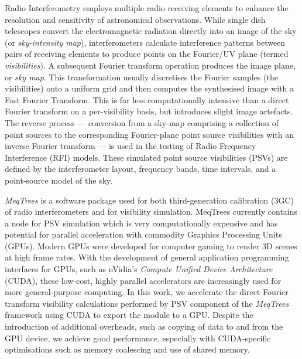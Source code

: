 Radio Interferometry employs multiple radio receiving elements  to enhance the resolution and sensitivity of astronomical observations. While single dish telescopes convert the electromagnetic radiation directly into an image of the sky (or \emph{sky-intensity map}), interferometers calculate interference patterns between pairs of receiving elements to produce points on the Fourier/UV plane (termed \emph{visibilities}).  A subsequent Fourier transform operation produces the image plane, or \emph{sky map}. This transformation usually discretises the Fourier samples (the visibilities) onto a uniform grid and then computes the synthesised image with a Fast Fourier Transform.  This is far less computationally intensive than a direct Fourier transform on a per-visibility basis, but introduces slight image artefacts.  The reverse process --- conversion from a sky-map comprising a collection of point sources to the corresponding Fourier-plane point source visibilities  with an inverse Fourier transform --- is used in the testing of Radio Frequency Interference (RFI) models.  These simulated point source visibilities (PSVs) are defined by the interferometer layout, frequency bands, time intervals, and a point-source model of the sky.


\emph{MeqTrees} is a software package used for both third-generation calibration (3GC) of radio interferometers and for  visibility simulation. MeqTrees currently contains a node for PSV simulation which is very computationally expensive and has potential for parallel acceleration with commodity Graphics Processing Units (GPUs). \label{sec:cuda}  Modern GPUs were developed for computer gaming to render 3D scenes at high frame rates. With the development of general application programming interfaces for GPUs, such as nVidia's \emph{Compute Unified Device Architecture} (CUDA), these low-cost, highly parallel accelerators are increasingly used for more general-purpose computing. In this work, we accelerate the direct Fourier transform visibility calculations performed by PSV component of the \emph{MeqTrees} framework using CUDA to export the module to a GPU.  Despite the introduction of additional overheads, such as copying of data to and from the GPU device, we achieve good performance, especially with CUDA-specific optimisations such as memory coalescing and use of shared memory.


